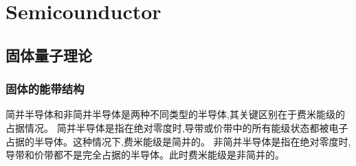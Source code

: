 \chapter{Semicounductor}

\section{固体量子理论}
\subsection{固体的能带结构}

简并半导体和非简并半导体是两种不同类型的半导体,其关键区别在于费米能级的占据情况。
简并半导体是指在绝对零度时,导带或价带中的所有能级状态都被电子占据的半导体。这种情况下,费米能级是简并的。
非简并半导体是指在绝对零度时,导带和价带都不是完全占据的半导体。此时费米能级是非简并的。
